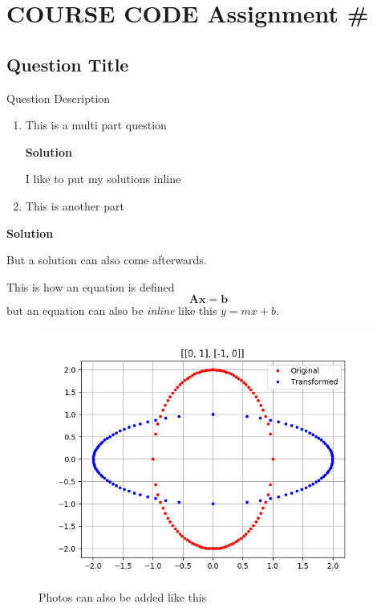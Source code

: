\documentclass[11pt,letterpaper]{article}
\author{YOUR NAME HERE}
\newcommand{\course}{COURSE CODE}
\newcommand{\assignment}{Assignment \#}
\newcommand{\soln}{\textbf{Solution}}
\begin{document}
\section*{\course{} \assignment{}}

\subsection*{Question Title}

Question Description
\begin{enumerate}[label=\alph*.]
  \item This is a multi part question

    \soln{}

    I like to put my solutions inline

  \item This is another part 
\end{enumerate}

\soln{}

But a solution can also come afterwards.

This is how an equation is defined
\begin{equation}
  \boldsymbol{Ax} = \boldsymbol{b}
\end{equation}
but an equation can also be \textit{inline} like this $y = mx + b$.

\begin{figure}[H]
  \centering
  \includegraphics[scale=0.5]{photos/my_img}
  \caption{Photos can also be added like this}\label{fig:img}
\end{figure}
\end{document}
